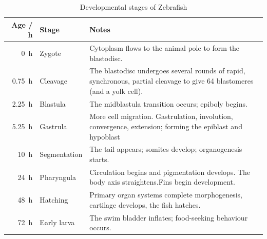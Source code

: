 \begin{table}
  \centering
  \begin{tabular*}{\textwidth}{rlp{23em}}
    Age / \SI{}{\hour}  & Stage & Notes \\
    \midrule
    \SI{0}{\hour} &  Zygote & Cytoplasm flows to the animal pole to form the blastodisc.\\
    \SI{0.75}{\hour} &  Cleavage & The blastodisc undergoes several rounds of rapid, synchronous, partial cleavage to give 64 blastomeres (and a yolk cell).\\
    \SI{2.25}{\hour} &  Blastula & The midblastula transition occurs; epiboly begins.\\
    \SI{5.25}{\hour} &  Gastrula & More cell migration. Gastrulation, involution, convergence, extension; forming the epiblast and hypoblast \\
    \SI{10}{\hour} & Segmentation & The tail appears; somites develop; organogenesis starts. \\
    \SI{24}{\hour} & Pharyngula &  Circulation begins and pigmentation develops. The body axis straightens.Fins begin development.\\
    \SI{48}{\hour} & Hatching & Primary organ systems complete morphogenesis, cartilage develops, the fish hatches.\\
    \SI{72}{\hour} & Early larva & The swim bladder inflates; food-seeking behaviour occurs.
  \end{tabular*}
  \caption{Developmental stages of Zebrafish}
  \label{tab:zfish_dev}
\end{table}

